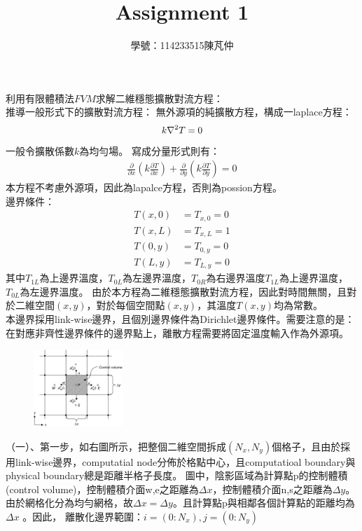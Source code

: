 \documentclass[12pt]{article}
\title{Assignment 1}
\author{學號：114233515陳芃仲\\}
\begin{document}
 
\maketitle 


\noindent 利用有限體積法$FVM$求解二維穩態擴散對流方程：\\
\noindent 推導一般形式下的擴散對流方程：
\noindent 無外源項的純擴散方程，構成一laplace方程：
\begin{equation}
    k\nabla^2 T= 0\\
\end{equation}
\noindent 一般令擴散係數$k$為均勻場。
\noindent 寫成分量形式則有：
\begin{equation}
    \begin{split}
        \frac{\partial }{\partial x}(k \frac{\partial T }{\partial x}) + \frac{\partial }{\partial y}(k \frac{\partial T }{\partial y}) = 0
    \end{split}
\end{equation}
\noindent 本方程不考慮外源項，因此為lapalce方程，否則為possion方程。\\
\noindent 邊界條件：
\begin{equation}
    \begin{split}
        T(x, 0) &= T_{x,0} = 0\\
        T(x, L) &= T_{x,L}= 1\\
        T(0, y) &= T_{0,y} = 0\\
        T(L, y) &= T_{L,y} = 0
    \end{split}
\end{equation}
\noindent 其中$T_{1L}$為上邊界溫度，$T_{0L}$為左邊界溫度，$T_{0R}$為右邊界溫度$T_{1L}$為上邊界溫度，$T_{0L}$為左邊界溫度。
\noindent 由於本方程為二維穩態擴散對流方程，因此對時間無關，且對於二維空間$(x,y)$，對於每個空間點$(x,y)$，其溫度$T(x,y)$均為常數。\\
\noindent 本邊界採用link-wise邊界，且個別邊界條件為Dirichlet邊界條件。需要注意的是：在對應非齊性邊界條件的邊界點上，離散方程需要將固定溫度輸入作為外源項。\\
\begin{figure}%
    \includegraphics[width=0.3\textwidth]{1.jpg}
\end{figure}
\noindent （一）、第一步，如右圖所示，把整個二維空間拆成$(N_x,N_y)$個格子，且由於採用link-wise邊界，computatial node分佈於格點中心，且computatioal boundary與physical boundary總是距離半格子長度。
圖中，陰影區域為計算點p的控制體積(control volume)，控制體積介面w,e之距離為$\Delta x$，控制體積介面n,s之距離為$\Delta y$。由於網格化分為均勻網格，故$\Delta x = \Delta y $。且計算點p與相鄰各個計算點的距離均為
$\Delta x$ 。因此， 離散化邊界範圍：$i = (0 : N_x) , j = (0 : N_y)$
\end{document}
